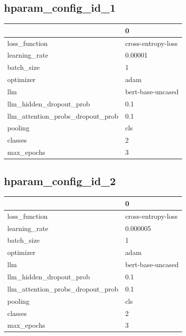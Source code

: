 \documentclass{article}
\begin{document}
\subsection{hparam\_config\_id\_1}
\begin{tabular}{ll}
\toprule
{} &                   0 \\
\midrule
loss\_function                    &  cross-entropy-loss \\
learning\_rate                    &             0.00001 \\
batch\_size                       &                   1 \\
optimizer                        &                adam \\
llm                              &   bert-base-uncased \\
llm\_hidden\_dropout\_prob          &                 0.1 \\
llm\_attention\_probs\_dropout\_prob &                 0.1 \\
pooling                          &                 cls \\
classes                          &                   2 \\
max\_epochs                       &                   3 \\
\bottomrule
\end{tabular}

\subsection{hparam\_config\_id\_2}
\begin{tabular}{ll}
\toprule
{} &                   0 \\
\midrule
loss\_function                    &  cross-entropy-loss \\
learning\_rate                    &            0.000005 \\
batch\_size                       &                   1 \\
optimizer                        &                adam \\
llm                              &   bert-base-uncased \\
llm\_hidden\_dropout\_prob          &                 0.1 \\
llm\_attention\_probs\_dropout\_prob &                 0.1 \\
pooling                          &                 cls \\
classes                          &                   2 \\
max\_epochs                       &                   3 \\
\bottomrule
\end{tabular}
\end{document}
